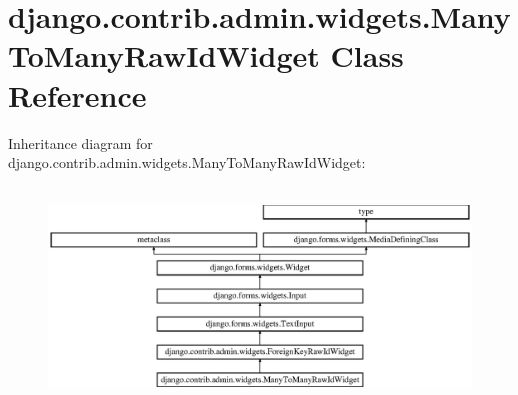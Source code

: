 \hypertarget{classdjango_1_1contrib_1_1admin_1_1widgets_1_1_many_to_many_raw_id_widget}{}\section{django.\+contrib.\+admin.\+widgets.\+Many\+To\+Many\+Raw\+Id\+Widget Class Reference}
\label{classdjango_1_1contrib_1_1admin_1_1widgets_1_1_many_to_many_raw_id_widget}
Inheritance diagram for django.\+contrib.\+admin.\+widgets.\+Many\+To\+Many\+Raw\+Id\+Widget\+:\begin{figure}[H]
\begin{center}
\leavevmode
\includegraphics[height=5.798817cm]{classdjango_1_1contrib_1_1admin_1_1widgets_1_1_many_to_many_raw_id_widget}
\end{center}
\end{figure}

